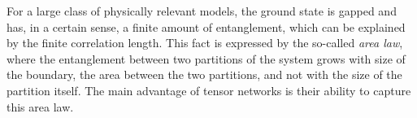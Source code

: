 For a large class of physically relevant models, the ground state is gapped and has, in a certain sense, a finite amount of entanglement, which can be explained by the finite correlation length.
This fact is expressed by the so-called \emph{area law}, where the entanglement between two partitions of the system grows with size of the boundary, the area between the two partitions, and not with the size of the partition itself.
The main advantage of tensor networks is their ability to capture this area law.

